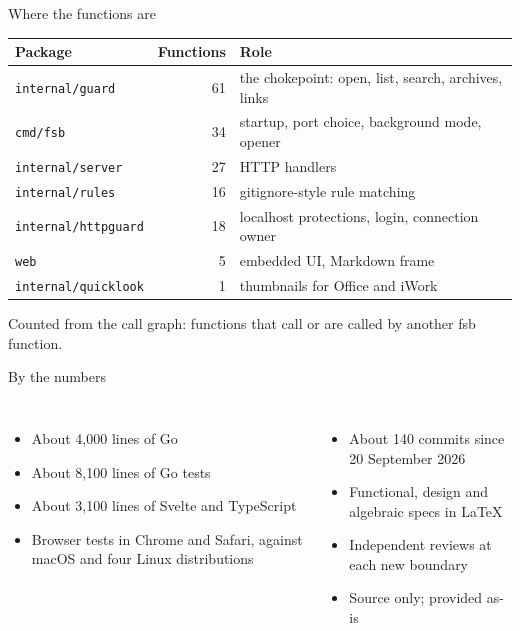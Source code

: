 \documentclass[aspectratio=169,11pt]{beamer}
\newcommand{\code}[1]{\texttt{\small #1}}
\begin{document}
\begin{frame}{Where the functions are}
  \centering
  \begin{tabular}{lrl}
    \toprule
    Package & Functions & Role \\
    \midrule
    \code{internal/guard}     & 61 & the chokepoint: open, list, search, archives, links \\
    \code{cmd/fsb}            & 34 & startup, port choice, background mode, opener \\
    \code{internal/server}    & 27 & HTTP handlers \\
    \code{internal/rules}     & 16 & gitignore-style rule matching \\
    \code{internal/httpguard} & 18 & localhost protections, login, connection owner \\
    \code{web}                &  5 & embedded UI, Markdown frame \\
    \code{internal/quicklook} &  1 & thumbnails for Office and iWork \\
    \bottomrule
  \end{tabular}
  \vfill
  \small Counted from the call graph: functions that call or are called by
  another fsb function.
\end{frame}

\begin{frame}{By the numbers}
  \begin{columns}[T]
    \begin{itemize}
      \item About 4,000 lines of Go
      \item About 8,100 lines of Go tests
      \item About 3,100 lines of Svelte and TypeScript
      \item Browser tests in Chrome and Safari, against macOS and four
        Linux distributions
    \end{itemize}
    \begin{itemize}
      \item About 140 commits since 20 September 2026
      \item Functional, design and algebraic specs in \LaTeX
      \item Independent reviews at each new boundary
      \item Source only; provided as-is
    \end{itemize}
  \end{columns}
\end{frame}
\end{document}
